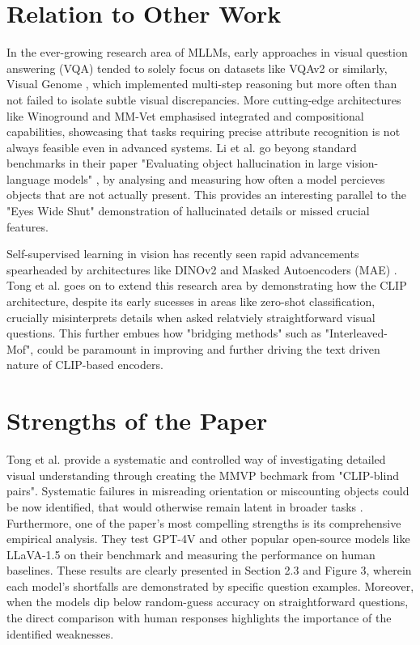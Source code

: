 \documentclass[11pt]{article}
\begin{document}
\section*{Relation to Other Work}

In the ever-growing research area of MLLMs, early approaches in visual question answering (VQA) tended to solely focus on datasets like VQAv2 \cite{Goyal2017CVPR} or similarly, Visual Genome \cite{Krishna2017IJCV_VisualGenome}, which implemented multi-step reasoning but more often than not failed to isolate subtle visual discrepancies.
More cutting-edge architectures like Winoground \cite{Thrush2022CVPR_Winoground} and MM-Vet \cite{Yu2023Arxiv_MMVet} emphasised integrated and compositional capabilities, showcasing that tasks requiring precise attribute recognition is not always feasible even in advanced systems.
Li et al. go beyong standard benchmarks in their paper "Evaluating object hallucination in large vision-language models" \cite{Li2023Arxiv_POPE}, by analysing and measuring how often a model percieves objects that are not actually present. This provides an interesting parallel to the "Eyes Wide Shut" demonstration of hallucinated details or missed crucial features.

Self-supervised learning in vision has recently seen rapid advancements spearheaded by architectures like DINOv2 \cite{Oquab2023DINOv2} and Masked Autoencoders (MAE) \cite{He2022CVPR_MAE}. 
Tong et al. goes on to extend this research area by demonstrating how the CLIP architecture, despite its early sucesses in areas like zero-shot classification, crucially misinterprets details when asked relatviely straightforward visual questions.
This further embues how "bridging methods" such as "Interleaved-Mof", could be paramount in improving and further driving the text driven nature of CLIP-based encoders.

\section*{Strengths of the Paper}

Tong et al. provide a systematic and controlled way of investigating detailed visual understanding through creating the MMVP bechmark from "CLIP-blind pairs". Systematic failures in misreading orientation or miscounting objects could be now identified, that would otherwise remain latent in broader tasks \cite{Tong2024CVPR}.
Furthermore, one of the paper's  most compelling strengths is its comprehensive empirical analysis. They test GPT-4V \cite{OpenAI2023GPT4} and other popular open-source models like LLaVA-1.5 \cite{Liu2023Arxiv_LLaVA15} on their benchmark and measuring the performance on human baselines. These results are clearly presented in Section 2.3 and Figure 3, wherein each model's shortfalls are demonstrated by specific question examples.
Moreover, when the models dip below random-guess accuracy on straightforward questions, the direct comparison with human responses highlights the importance of the identified weaknesses.
\end{document}
